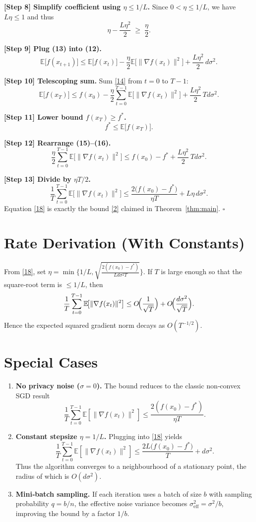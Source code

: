 \documentclass{article}
\newcommand{\E}{\mathbb{E}}
\begin{document}
\noindent\textbf{[Step 8] Simplify coefficient using $\eta\le 1/L$.}  
Since $0<\eta\le 1/L$, we have $L\eta\le1$ and thus
\[
\eta-\frac{L\eta^{2}}{2}\;\ge\;\frac{\eta}{2}.
\tag{13}
\]

\noindent\textbf{[Step 9] Plug (13) into (12).}
\[
\E\!\bigl[f(x_{t+1})\bigr]
\le \E\!\bigl[f(x_{t})\bigr]
-\frac{\eta}{2}\E\!\bigl[\|\nabla f(x_{t})\|^{2}\bigr]
+\frac{L\eta^{2}}{2}\,d\sigma^{2}.
\tag{14}
\]

\noindent\textbf{[Step 10] Telescoping sum.}  
Sum \eqref{14} from $t=0$ to $T-1$:
\[
\E\!\bigl[f(x_{T})\bigr]
\le f(x_{0})
-\frac{\eta}{2}\sum_{t=0}^{T-1}\E\!\bigl[\|\nabla f(x_{t})\|^{2}\bigr]
+\frac{L\eta^{2}}{2}\,Td\sigma^{2}.
\tag{15}
\]

\noindent\textbf{[Step 11] Lower bound $f(x_{T})\ge f^{*}$.}
\[
f^{*}\le \E\!\bigl[f(x_{T})\bigr].
\tag{16}
\]

\noindent\textbf{[Step 12] Rearrange (15)–(16).}
\[
\frac{\eta}{2}\sum_{t=0}^{T-1}\E\!\bigl[\|\nabla f(x_{t})\|^{2}\bigr]
\le f(x_{0})-f^{*}
+\frac{L\eta^{2}}{2}\,Td\sigma^{2}.
\tag{17}
\]

\noindent\textbf{[Step 13] Divide by $\eta T/2$.}
\[
\frac{1}{T}\sum_{t=0}^{T-1}\E\!\bigl[\|\nabla f(x_{t})\|^{2}\bigr]
\le \frac{2\bigl(f(x_{0})-f^{*}\bigr)}{\eta T}
+L\eta\,d\sigma^{2}.
\tag{18}
\]
Equation \eqref{18} is exactly the bound \eqref{2} claimed in Theorem~\ref{thm:main}.
\hfill $\square$

\section*{Rate Derivation (With Constants)}
From \eqref{18}, set $\eta = \min\!\bigl\{1/L,\sqrt{\frac{2(f(x_{0})-f^{*})}{L d\sigma^{2}T}}\bigr\}$.
If $T$ is large enough so that the square‑root term is $\le 1/L$, then
\[
\frac{1}{T}\sum_{t=0}^{T-1}\E\!\bigl[\|\nabla f(x_{t})\|^{2}\bigr]
\le
O\!\Bigl(\frac{1}{\sqrt{T}}\Bigr)+O\!\Bigl(\frac{d\sigma^{2}}{\sqrt{T}}\Bigr).
\]
Hence the expected squared gradient norm decays as $O(T^{-1/2})$.

\section*{Special Cases}
\begin{enumerate}
\item \textbf{No privacy noise ($\sigma=0$).} The bound reduces to the classic
non‑convex SGD result
\[
\frac{1}{T}\sum_{t=0}^{T-1}\E[\|\nabla f(x_{t})\|^{2}]
\le \frac{2(f(x_{0})-f^{*})}{\eta T}.
\]
\item \textbf{Constant stepsize $\eta=1/L$.} Plugging into \eqref{18} yields
\[
\frac{1}{T}\sum_{t=0}^{T-1}\E[\|\nabla f(x_{t})\|^{2}]
\le \frac{2L\bigl(f(x_{0})-f^{*}\bigr)}{T}
+ d\sigma^{2}.
\]
Thus the algorithm converges to a neighbourhood of a stationary point,
the radius of which is $O(d\sigma^{2})$.
\item \textbf{Mini‑batch sampling.} If each iteration uses a batch of size $b$
with sampling probability $q=b/n$, the effective noise variance becomes
$\sigma^{2}_{\text{eff}}= \sigma^{2}/b$, improving the bound by a factor $1/b$.
\end{enumerate}
\end{document}
